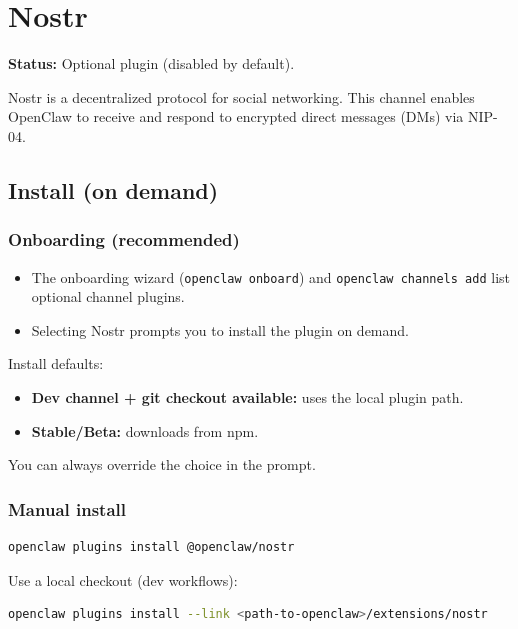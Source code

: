 


\clearpage

\section{Nostr}


\textbf{Status:} Optional plugin (disabled by default).

Nostr is a decentralized protocol for social networking. This channel enables OpenClaw to receive and respond to encrypted direct messages (DMs) via NIP-04.

\subsection{Install (on demand)}


\subsubsection{Onboarding (recommended)}


\begin{itemize}
  \item The onboarding wizard (\texttt{openclaw onboard}) and \texttt{openclaw channels add} list optional channel plugins.
  \item Selecting Nostr prompts you to install the plugin on demand.
\end{itemize}


Install defaults:

\begin{itemize}
  \item \textbf{Dev channel + git checkout available:} uses the local plugin path.
  \item \textbf{Stable/Beta:} downloads from npm.
\end{itemize}


You can always override the choice in the prompt.

\subsubsection{Manual install}


\begin{lstlisting}[language=bash]
openclaw plugins install @openclaw/nostr
\end{lstlisting}


Use a local checkout (dev workflows):

\begin{lstlisting}[language=bash]
openclaw plugins install --link <path-to-openclaw>/extensions/nostr
\end{lstlisting}


